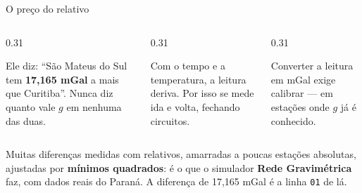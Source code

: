 \documentclass[aspectratio=169,11pt]{beamer}
\newcommand{\bnum}[1]{\textbf{\textcolor{mTeal}{#1}}}
\begin{document}
\begin{frame}{O preço do relativo}
  \begin{columns}[T]
    \begin{column}{0.31\textwidth}
      \begin{armadilha}[title={1 · Só mede diferença}]
        \small\raggedright Ele diz: ``São Mateus do Sul tem \bnum{17,165 mGal} a mais que
        Curitiba''. Nunca diz quanto vale $g$ em nenhuma das duas.
      \end{armadilha}
    \end{column}
    \begin{column}{0.31\textwidth}
      \begin{armadilha}[title={2 · A mola escorrega}]
        \small\raggedright Com o tempo e a temperatura, a leitura deriva. Por isso se mede
        ida e volta, fechando circuitos.
      \end{armadilha}
    \end{column}
    \begin{column}{0.31\textwidth}
      \begin{armadilha}[title={3 · Precisa de escala}]
        \small\raggedright Converter a leitura em mGal exige calibrar --- em estações onde
        $g$ já é conhecido.
      \end{armadilha}
    \end{column}
  \end{columns}
  \bigskip
  \begin{cuidado}[title={É o problema do simulador}]
    Muitas diferenças medidas com relativos, amarradas a poucas estações absolutas,
    ajustadas por \bnum{mínimos quadrados}: é o que o simulador \textbf{Rede Gravimétrica}
    faz, com dados reais do Paraná. A diferença de 17,165 mGal é a linha \texttt{01} de lá.
  \end{cuidado}
\end{frame}
\end{document}
